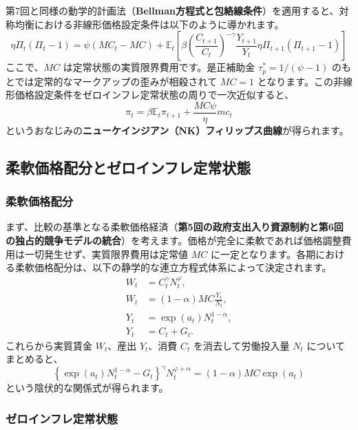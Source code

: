 \documentclass[
  japanese,
  lualatex,
  ja=standard,
  12pt,
  a4paper]{ltjsarticle}
\begin{document}
\Needspace{0.25\textheight}

第7回と同様の動学的計画法（\textbf{Bellman方程式と包絡線条件}）を適用すると、対称均衡における非線形価格設定条件は以下のように導かれます。
\[
\eta\Pi_t(\Pi_t-1)
=
\psi(MC_t-MC)
+\mathbb{E}_t\left[
\beta\left(\frac{C_{t+1}}{C_t}\right)^{-\gamma}
\frac{Y_{t+1}}{Y_t}
\eta\Pi_{t+1}(\Pi_{t+1}-1)
\right]
\] ここで、\(MC\) は定常状態の実質限界費用です。是正補助金
\(\tau_p^*=1/(\psi-1)\) のもとでは定常的なマークアップの歪みが相殺されて
\(MC=1\)
となります。この非線形価格設定条件をゼロインフレ定常状態の周りで一次近似すると、
\[
\pi_t=\beta\mathbb{E}_t\pi_{t+1}
+\frac{MC\psi}{\eta}mc_t
\]
というおなじみの\textbf{ニューケインジアン（NK）フィリップス曲線}が得られます。

\subsection{柔軟価格配分とゼロインフレ定常状態}\label{ux67d4ux8edfux4fa1ux683cux914dux5206ux3068ux30bcux30edux30a4ux30f3ux30d5ux30ecux5b9aux5e38ux72b6ux614b}

\subsubsection{柔軟価格配分}\label{ux67d4ux8edfux4fa1ux683cux914dux5206}

まず、比較の基準となる柔軟価格経済（\textbf{第5回の政府支出入り資源制約と第6回の独占的競争モデルの統合}）を考えます。価格が完全に柔軟であれば価格調整費用は一切発生せず、実質限界費用は定常値
\(MC\)
に一定となります。各期における柔軟価格配分は、以下の静学的な連立方程式体系によって決定されます。
\[
\begin{aligned}
W_t&=C_t^\gamma N_t^\varphi,\\
W_t&=(1-\alpha)MC\frac{Y_t}{N_t},\\
Y_t&=\exp(a_t)N_t^{1-\alpha},\\
Y_t&=C_t+G_t.
\end{aligned}
\] これらから実質賃金 \(W_t\)、産出 \(Y_t\)、消費 \(C_t\)
を消去して労働投入量 \(N_t\) についてまとめると、 \[
\left\{\exp(a_t)N_t^{1-\alpha}-G_t\right\}^{\gamma}
N_t^{\varphi+\alpha}
=
(1-\alpha)MC\exp(a_t)
\] という陰伏的な関係式が得られます。

\Needspace{0.23\textheight}

\subsubsection{ゼロインフレ定常状態}\label{ux30bcux30edux30a4ux30f3ux30d5ux30ecux5b9aux5e38ux72b6ux614b}
\end{document}
